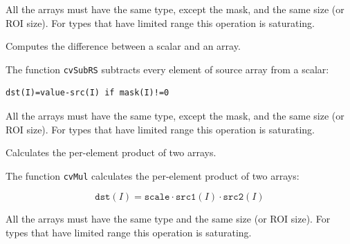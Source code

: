 All the arrays must have the same type, except the mask, and the same size (or ROI size).
For types that have limited range this operation is saturating.


\label{SubRS}

Computes the difference between a scalar and an array.


\begin{description}
\end{description}


The function \texttt{cvSubRS} subtracts every element of source array from a scalar:

\begin{lstlisting}
dst(I)=value-src(I) if mask(I)!=0
\end{lstlisting}

All the arrays must have the same type, except the mask, and the same size (or ROI size).
For types that have limited range this operation is saturating.

\label{Mul}

Calculates the per-element product of two arrays.


\begin{description}
\end{description}


The function \texttt{cvMul} calculates the per-element product of two arrays:

\[
\texttt{dst}(I)=\texttt{scale} \cdot \texttt{src1}(I) \cdot \texttt{src2}(I)
\]

All the arrays must have the same type and the same size (or ROI size).
For types that have limited range this operation is saturating.

